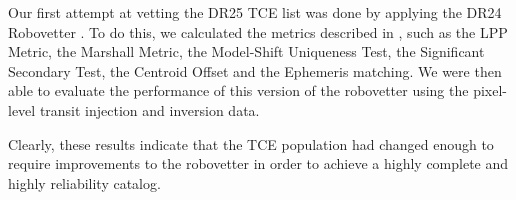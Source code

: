 Our first attempt at vetting the DR25 TCE list was done by applying the DR24 Robovetter \citep{Coughlin2016}. To do this, we calculated the metrics described in \citet{Coughlin2016}, such as the LPP Metric, the Marshall Metric, the Model-Shift Uniqueness Test, the Significant Secondary Test, the Centroid Offset and the Ephemeris matching.  We were then able to evaluate the performance of this version of the 
robovetter using the pixel-level transit injection and inversion data. 


Clearly, these results indicate that the TCE population had changed enough to require improvements to the robovetter in order to achieve a highly complete and highly reliability catalog.

